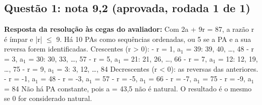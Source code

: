 \documentclass{article}%
\begin{document}
\subsection*{Questão 1: nota 9,2 (aprovada, rodada 1 de 1)}%
\textbf{Resposta da resolução às cegas do avaliador:} Com 2a + 9r = 87, a razão r é ímpar e |r| $\leq$ 9. Há 10 PAs como sequências ordenadas, ou 5 se a PA e a sua reversa forem identificadas.\newline%
\newline%
Crescentes (r > 0):\newline%
{-} r = 1, a$_{1}$ = 39: 39, 40, \ldots{}, 48\newline%
{-} r = 3, a$_{1}$ = 30: 30, 33, \ldots{}, 57\newline%
{-} r = 5, a$_{1}$ = 21: 21, 26, \ldots{}, 66\newline%
{-} r = 7, a$_{1}$ = 12: 12, 19, \ldots{}, 75\newline%
{-} r = 9, a$_{1}$ = 3: 3, 12, \ldots{}, 84\newline%
\newline%
Decrescentes (r < 0): as reversas das anteriores.\newline%
{-} r = -1, a$_{1}$ = 48\newline%
{-} r = -3, a$_{1}$ = 57\newline%
{-} r = -5, a$_{1}$ = 66\newline%
{-} r = -7, a$_{1}$ = 75\newline%
{-} r = -9, a$_{1}$ = 84\newline%
\newline%
Não há PA constante, pois a = 43,5 não é natural. O resultado é o mesmo se 0 for considerado natural.\par %
\end{document}
